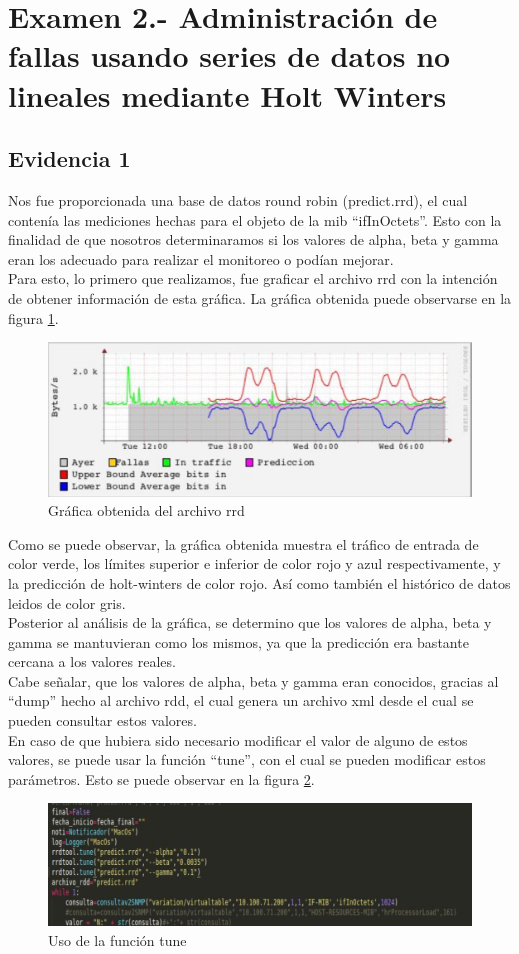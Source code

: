 \section{Examen 2.- Administración de fallas usando series de datos no lineales mediante Holt Winters}
\subsection{Evidencia 1}
Nos fue proporcionada una base de datos round robin (predict.rrd), el cual contenía las mediciones hechas para el objeto de la mib ``ifInOctets''. Esto con la finalidad de que nosotros determinaramos si los valores de alpha, beta y gamma eran los adecuado para realizar el monitoreo o podían mejorar.\\Para esto, lo primero que realizamos, fue graficar el archivo rrd con la intención de obtener información de esta gráfica. La gráfica obtenida puede observarse en la figura \ref{img:1-1}.
\begin{figure}[H]
  \centering
    \includegraphics[scale=.75]{imagenes/segundo/1.png}
    \caption{Gráfica obtenida del archivo rrd}
    \label{img:1-1}
\end{figure}
Como se puede observar, la gráfica obtenida muestra el tráfico de entrada de color verde, los límites superior e inferior de color rojo y azul respectivamente, y la predicción de holt-winters de color rojo. Así como también el histórico de datos leidos de color gris.\\Posterior al análisis de la gráfica, se determino que los valores de alpha, beta y gamma se mantuvieran como los mismos, ya que la predicción era bastante cercana a los valores reales.\\Cabe señalar, que los valores de alpha, beta y gamma eran conocidos, gracias al ``dump'' hecho al archivo rdd, el cual genera un archivo xml desde el cual se pueden consultar estos valores.\\En caso de que hubiera sido necesario modificar el valor de alguno de estos valores, se puede usar la función ``tune'', con el cual se pueden modificar estos parámetros. Esto se puede observar en la figura \ref{img:1-2}.
\begin{figure}[H]
  \centering
    \includegraphics[scale=.75]{imagenes/segundo/2.png}
    \caption{Uso de la función tune}
    \label{img:1-2}
\end{figure}

